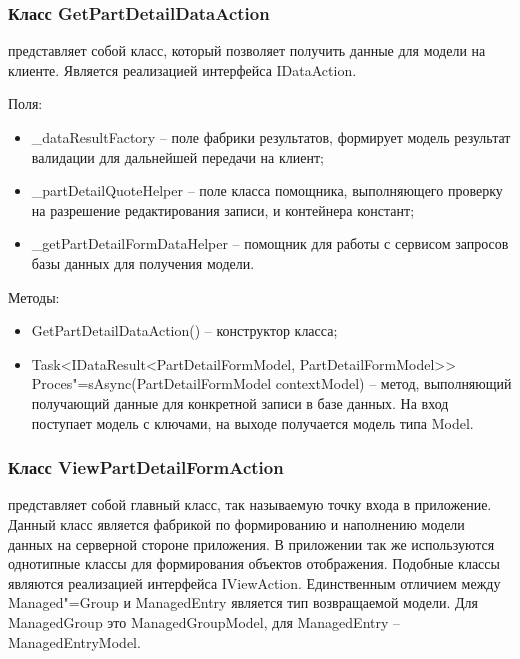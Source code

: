 \subsubsection{Класс GetPartDetailDataAction }
\label{sub:arch_and_mod:data_layer:get_part_detail}

представляет собой класс, который позволяет получить данные для модели на клиенте. Является реализацией интерфейса IDataAction.

Поля:
\begin{itemize}
  \item \_dataResultFactory – поле фабрики результатов, формирует модель результат валидации для дальнейшей передачи на клиент;
  \item \_partDetailQuoteHelper – поле класса помощника, выполняющего проверку на разрешение редактирования записи, и контейнера констант;
  \item \_getPartDetailFormDataHelper – помощник для работы с сервисом запросов базы данных для получения модели.
\end{itemize}

Методы:
\begin{itemize}
  \item GetPartDetailDataAction() – конструктор класса;
  \item Task<IDataResult<PartDetailFormModel, PartDetailFormModel>> Proces"=sAsync(PartDetailFormModel contextModel) – метод, выполняющий получающий данные для конкретной записи в базе данных. На вход поступает модель с ключами, на выходе получается модель типа Model.
\end{itemize}

\subsubsection{Класс ViewPartDetailFormAction }
\label{sub:arch_and_mod:data_layer:view_part_detail}

представляет собой главный класс, так называемую точку входа в приложение. Данный класс является фабрикой по формированию и наполнению модели данных на серверной стороне приложения. В приложении так же используются однотипные классы для формирования объектов отображения. Подобные классы являются реализацией интерфейса IViewAction. Единственным отличием между Managed"=Group и ManagedEntry является тип возвращаемой модели. Для ManagedGroup это ManagedGroupModel, для ManagedEntry – ManagedEntryModel.

